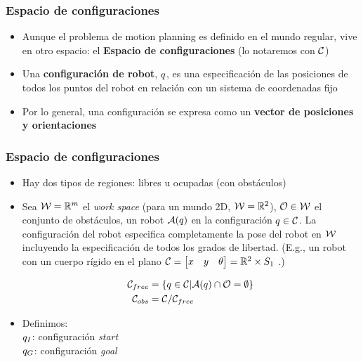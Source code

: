 \begin{frame}
	\frametitle{Espacio de configuraciones}
	
	\begin{itemize}
		\item Aunque el problema de motion planning es definido en el mundo regular, vive en otro espacio: el {\bf Espacio de configuraciones} (lo notaremos con $\mathcal{C}$)
		\item Una {\bf configuración de robot}, $q$, es una especificación de las posiciones de todos los puntos del robot en relación con un sistema de coordenadas fijo
		\item Por lo general, una configuración se expresa como un {\bf vector de posiciones y orientaciones}
	\end{itemize}

	
\end{frame}

\begin{frame}
	\frametitle{Espacio de configuraciones}
	\begin{itemize}
		\item Hay dos tipos de regiones: libres u ocupadas (con obstáculos)
		\item Sea $\mathcal{W} = \mathbb{R}^{m}$ el \emph{work space} (para un mundo 2D, $\mathcal{W} = \mathbb{R}^{2}$), $\mathcal{O} \in \mathcal{W}$ el conjunto de obstáculos, un robot $\mathcal{A}(q)$ en la configuración $q \in \mathcal{C}$.
        La configuración del robot especifica completamente la pose del robot en $\mathcal{W}$ incluyendo la especificación de todos los grados de libertad. (E.g., un robot con un cuerpo rígido en el plano $\mathcal{C} = \begin{bmatrix}
            x & y & \theta
        \end{bmatrix} = \mathbb{R}^{2} \times S_{1}$ .)
        
		\begin{align*}
			 \mathcal{C}_{free} &= \left\lbrace q \in \mathcal{C} | \mathcal{A}(q) \cap \mathcal{O} =  \emptyset \right\rbrace\\
			 \mathcal{C}_{obs} &= \mathcal{C} / \mathcal{C}_{free}
		\end{align*}
	
		\item Definimos:\\
		$q_{I}$: configuración \emph{start}\\
		$q_{G}$: configuración \emph{goal}
	\end{itemize}
	
\end{frame}

